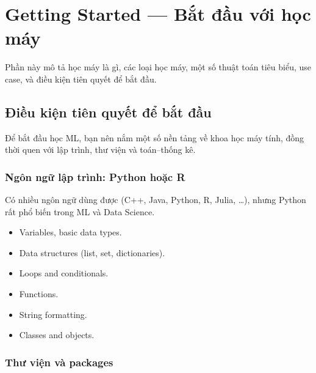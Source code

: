 \section{Getting Started --- Bắt đầu với học máy}

\begin{dongco}[title={target}]
Phần này mô tả học máy là gì, các loại học máy, một số thuật toán tiêu biểu, use case, và điều kiện tiên quyết để bắt đầu.
\end{dongco}

\subsection{Điều kiện tiên quyết để bắt đầu}

\begin{dongco}[title={Học ML dễ hơn khi chuẩn bị đúng}]
Để bắt đầu học ML, bạn nên nắm một số nền tảng về khoa học máy tính, đồng thời quen với lập trình, thư viện và toán--thống kê.
\end{dongco}

\subsubsection{Ngôn ngữ lập trình: Python hoặc R}

\begin{phuongphap}[title={Gợi ý}]
Có nhiều ngôn ngữ dùng được (C++, Java, Python, R, Julia, \ldots), nhưng Python rất phổ biến trong ML và Data Science.
\end{phuongphap}

\begin{phuongphap}[title={Các chủ đề Python cơ bản nên nắm}]
\begin{itemize}
  \item Variables, basic data types.
  \item Data structures (list, set, dictionaries).
  \item Loops and conditionals.
  \item Functions.
  \item String formatting.
  \item Classes and objects.
\end{itemize}
\end{phuongphap}

\subsubsection{Thư viện và packages}

